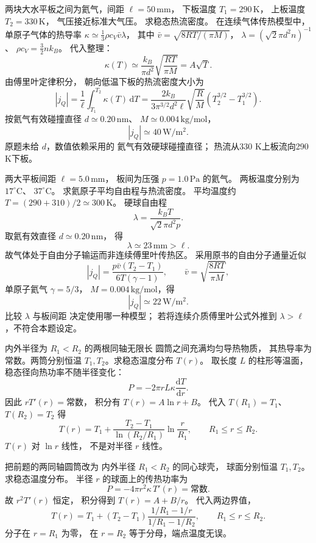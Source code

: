 两块大水平板之间为氦气，间距
$\ell=50\,\mathrm{mm}$，
下板温度 $T_1=290\,\mathrm K$，
上板温度 $T_2=330\,\mathrm K$，
气压接近标准大气压。
求稳态热流密度。
\exsolution
在连续气体传热模型中，
单原子气体的热导率
$\kappa\simeq\frac13\rho c_V\bar v\lambda$，
其中 $\bar v=\sqrt{8RT/(\pi M)}$，
$\lambda=(\sqrt2\pi d^2n)^{-1}$、
$\rho c_V=\frac32nk_B$。
代入整理：
\[
\kappa(T)\simeq
\frac{k_B}{\pi d^2}\sqrt{\frac{RT}{\pi M}}
=A\sqrt T.
\]
由傅里叶定律积分，
朝向低温下板的热流密度大小为
\[
|j_Q|=\frac1\ell\int_{T_1}^{T_2}\kappa(T)\,\mathrm dT
=\boxed{\frac{2k_B}{3\pi^{3/2}d^2\ell}
\sqrt{\frac RM}(T_2^{3/2}-T_1^{3/2})}.
\]
按氦气有效碰撞直径
$d\simeq0.20\,\mathrm{nm}$、
$M\simeq0.004\,\mathrm{kg/mol}$，
\[
\boxed{|j_Q|\simeq40\,\mathrm{W/m^2}}.
\]
\excheck 原题未给 $d$，数值依赖采用的
氦气有效硬球碰撞直径；
热流从330 K上板流向290 K下板。

两大平板间距 $\ell=5.0\,\mathrm{mm}$，
板间为压强 $p=1.0\,\mathrm{Pa}$ 的氦气。
两板温度分别为 $17^\circ\mathrm C$、
$37^\circ\mathrm C$。
求氦原子平均自由程与热流密度。
\exsolution
平均温度约
$T=(290+310)/2\simeq300\,\mathrm K$。
硬球自由程
\[
\lambda=\frac{k_BT}{\sqrt2\pi d^2p}.
\]
取氦有效直径 $d\simeq0.20\,\mathrm{nm}$，
得
\[
\boxed{\lambda\simeq23\,\mathrm{mm}>\ell}.
\]
故气体处于自由分子输运而非连续傅里叶传热区。
采用原书的自由分子通量近似
\[
|j_Q|=\frac{p\bar v(T_2-T_1)}
{6T(\gamma-1)},\qquad
\bar v=\sqrt{\frac{8RT}{\pi M}},
\]
单原子氦气 $\gamma=5/3$，
$M=0.004\,\mathrm{kg/mol}$，得
\[
\boxed{|j_Q|\simeq22\,\mathrm{W/m^2}}.
\]
\excheck 比较 $\lambda$ 与板间距
决定使用哪一种模型；
若将连续介质傅里叶公式外推到
$\lambda>\ell$，不符合本题设定。

内外半径为 $R_1<R_2$ 的两根同轴无限长
圆筒之间充满均匀导热物质，
其热导率为常数。两筒分别恒温
$T_1,T_2$。求稳态温度分布 $T(r)$。
\exsolution
取长度 $L$ 的柱形等温面，
稳态径向热功率不随半径变化：
\[
P=-2\pi rL\kappa\frac{\mathrm dT}{\mathrm dr}.
\]
因此 $rT'(r)=\text{常数}$，
积分有 $T(r)=A\ln r+B$。
代入 $T(R_1)=T_1$、
$T(R_2)=T_2$ 得
\[
\boxed{T(r)=T_1+
\frac{T_2-T_1}{\ln(R_2/R_1)}
\ln\frac r{R_1}},\qquad R_1\le r\le R_2.
\]
\excheck $T(r)$ 对 $\ln r$ 线性，
不是对半径 $r$ 线性。

把前题的两同轴圆筒改为
内外半径 $R_1<R_2$ 的同心球壳，
球面分别恒温 $T_1,T_2$。
求稳态温度分布。
\exsolution
半径 $r$ 的球面上的传热功率为
\[
P=-4\pi r^2\kappa\,T'(r)=\text{常数}.
\]
故 $r^2T'(r)$ 恒定，
积分得到 $T(r)=A+B/r$。
代入两边界值，
\[
\boxed{T(r)=T_1+
(T_2-T_1)
\frac{1/R_1-1/r}{1/R_1-1/R_2}},
\qquad R_1\le r\le R_2.
\]
\excheck 分子在 $r=R_1$ 为零，
在 $r=R_2$ 等于分母，端点温度无误。

